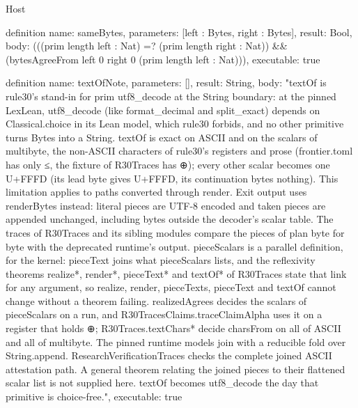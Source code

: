 \begin{lexlean}{Host}
\begin{semanticmodule}
definition{
  name: sameBytes,
  parameters: [left : Bytes, right : Bytes],
  result: Bool,
  body: (((prim length left : Nat) =? (prim length right : Nat)) && (bytesAgreeFrom left 0 right 0 (prim length left : Nat))),
  executable: true
}

definition{
  name: textOfNote,
  parameters: [],
  result: String,
  body: "textOf is rule30's stand-in for prim utf8_decode at the String boundary: at the pinned LexLean, utf8_decode (like format_decimal and split_exact) depends on Classical.choice in its Lean model, which rule30 forbids, and no other primitive turns Bytes into a String. textOf is exact on ASCII and on the scalars of multibyte, the non-ASCII characters of rule30's registers and prose (frontier.toml has only ≤, the fixture of R30Traces has ⊕); every other scalar becomes one U+FFFD (its lead byte gives U+FFFD, its continuation bytes nothing). This limitation applies to paths converted through render. Exit output uses renderBytes instead: literal pieces are UTF-8 encoded and taken pieces are appended unchanged, including bytes outside the decoder's scalar table. The traces of R30Traces and its sibling modules compare the pieces of plan byte for byte with the deprecated runtime's output. pieceScalars is a parallel definition, for the kernel: pieceText joins what pieceScalars lists, and the reflexivity theorems realize*, render*, pieceText* and textOf* of R30Traces state that link for any argument, so realize, render, pieceTexts, pieceText and textOf cannot change without a theorem failing. realizedAgrees decides the scalars of pieceScalars on a run, and R30TracesClaims.traceClaimAlpha uses it on a register that holds ⊕; R30Traces.textChars* decide charsFrom on all of ASCII and all of multibyte. The pinned runtime models join with a reducible fold over String.append. ResearchVerificationTraces checks the complete joined ASCII attestation path. A general theorem relating the joined pieces to their flattened scalar list is not supplied here. textOf becomes utf8_decode the day that primitive is choice-free.",
  executable: true
}


\end{semanticmodule}
\end{lexlean}

